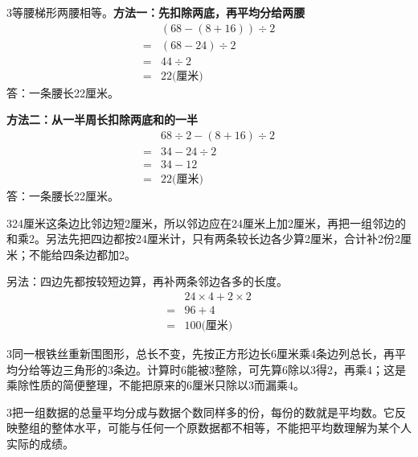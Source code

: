 \documentclass[multi=snippet,border={5bp 20bp 5bp 5bp}]{standalone}
\newenvironment{snippet}[3]{\begin{minipage}{#1bp}\color{answerred}\fontsize{#2}{#3}\selectfont\raggedright}{\end{minipage}}
\begin{document}
\begin{snippet}{505}{11.5}{14}\begin{multicols}{3}\raggedcolumns 等腰梯形两腰相等。\textbf{方法一：先扣除两底，再平均分给两腰}\[\begin{aligned}&(68-(8+16))\div2\\={}&(68-24)\div2\\={}&44\div2\\={}&22\text{(厘米)}\end{aligned}\]答：一条腰长22厘米。\par\textbf{方法二：从一半周长扣除两底和的一半}\[\begin{aligned}&68\div2-(8+16)\div2\\={}&34-24\div2\\={}&34-12\\={}&22\text{(厘米)}\end{aligned}\]答：一条腰长22厘米。\end{multicols}\end{snippet}
\begin{snippet}{505}{11.5}{14}\begin{multicols}{3}\raggedcolumns 24厘米这条边比邻边短2厘米，所以邻边应在24厘米上加2厘米，再把一组邻边的和乘2。另法先把四边都按24厘米计，只有两条较长边各少算2厘米，合计补2份2厘米；不能给四条边都加2。\par 另法：四边先都按较短边算，再补两条邻边各多的长度。\[\begin{aligned}&24\times4+2\times2\\={}&96+4\\={}&100\text{(厘米)}\end{aligned}\]\end{multicols}\end{snippet}
\begin{snippet}{505}{11.5}{14}\begin{multicols}{3}\raggedcolumns 同一根铁丝重新围图形，总长不变，先按正方形边长6厘米乘4条边列总长，再平均分给等边三角形的3条边。计算时6能被3整除，可先算6除以3得2，再乘4；这是乘除性质的简便整理，不能把原来的6厘米只除以3而漏乘4。\end{multicols}\end{snippet}
\begin{snippet}{505}{11.5}{14}\begin{multicols}{3}\raggedcolumns 把一组数据的总量平均分成与数据个数同样多的份，每份的数就是平均数。它反映整组的整体水平，可能与任何一个原数据都不相等，不能把平均数理解为某个人实际的成绩。\end{multicols}\end{snippet}
\end{document}
